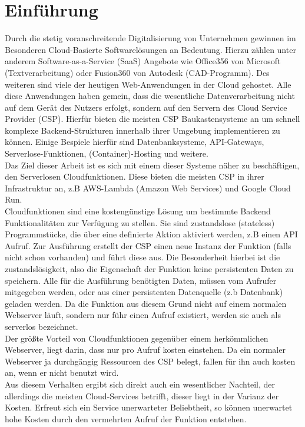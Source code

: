 \documentclass[12pt,a4paper,parskip=half]{scrreprt}
\begin{document}

\chapter{Einführung}
Durch die stetig voranschreitende Digitalisierung von Unternehmen gewinnen im Besonderen Cloud-Basierte Softwarelösungen an Bedeutung. Hierzu zählen unter anderem Software-as-a-Service (SaaS) Angebote wie Office356 von Microsoft (Textverarbeitung) oder Fusion360 von Autodesk (CAD-Programm). Des weiteren sind viele der heutigen Web-Anwendungen in der Cloud gehostet.  Alle diese Anwendungen haben gemein, dass die wesentliche Datenverarbeitung nicht auf dem Gerät des Nutzers erfolgt, sondern auf den Servern des Cloud Service Provider (CSP). Hierfür bieten die meisten CSP Baukastensysteme an um schnell komplexe Backend-Strukturen innerhalb ihrer Umgebung implementieren zu können. Einige Bespiele hierfür sind Datenbanksysteme, API-Gateways, Serverlose-Funktionen, (Container)-Hosting und weitere.
\\
Das Ziel dieser Arbeit ist es sich mit einem dieser Systeme näher zu beschäftigen, den Serverlosen Cloudfunktionen. Diese bieten die meisten CSP in ihrer Infrastruktur an, z.B AWS-Lambda (Amazon Web Services) und Google Cloud Run.
\\
Cloudfunktionen sind eine kostengünstige Lösung um bestimmte Backend Funktionalitäten zur Verfügung zu stellen. Sie sind zustandslose (stateless) Programmstücke, die über eine definierte Aktion aktiviert werden, z.B einen API Aufruf. Zur Ausführung erstellt der CSP einen neue Instanz der Funktion (falls nicht schon vorhanden) und führt diese aus. Die Besonderheit hierbei ist die zustandslösigkeit, also die Eigenschaft der Funktion keine persistenten Daten zu speichern. Alle für die Ausführung benötigten Daten, müssen vom Aufrufer mitgegeben werden, oder aus einer persistenten Datenquelle (z.b Datenbank) geladen werden. Da die Funktion aus diesem Grund nicht auf einem normalen Webserver läuft, sondern nur führ einen Aufruf existiert, werden sie auch als serverlos bezeichnet. \cite{Lambda-overview} 
\\
Der größte Vorteil von Cloudfunktionen gegenüber einem herkömmlichen Webserver, liegt darin, dass nur pro Aufruf kosten einstehen. Da ein normaler Webserver ja durchgängig Ressourcen des CSP belegt, fallen für ihn auch kosten an, wenn er nicht benutzt wird.
\\
Aus diesem Verhalten ergibt sich direkt auch ein wesentlicher Nachteil, der allerdings die meisten Cloud-Services betrifft, dieser liegt in der Varianz der Kosten. Erfreut sich ein Service unerwarteter Beliebtheit, so können unerwartet hohe Kosten durch den vermehrten Aufruf der Funktion entstehen.
\end{document}
